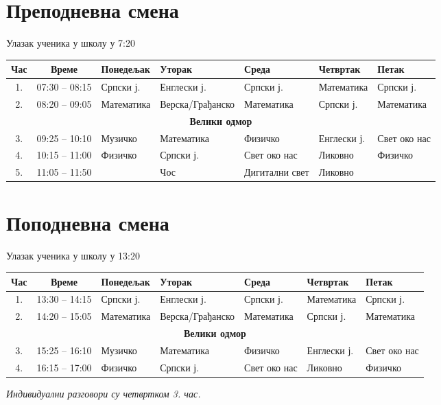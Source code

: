 \documentclass[14pt]{extarticle}
\begin{document}
\section*{Преподневна смена}
\noindent Улазак ученика у школу у 7:20


\bigskip
\noindent
\begin{tabularx}{\textwidth}{|c|c|X|X|X|X|X|}
\hline
\textbf{Час} & \textbf{Време} & \textbf{Понедељак} & \textbf{Уторак} & \textbf{Среда} & \textbf{Четвртак} & \textbf{Петак} \\
\hline
1. & 07:30 -- 08:15 & Српски ј. & Енглески ј. & Српски ј. & Математика & Српски ј. \\
\hline
2. & 08:20 -- 09:05 & Математика & Верска/Грађанско & Математика & Српски ј. & Математика \\
\hline
\multicolumn{7}{|c|}{\textbf{Велики одмор}} \\
\hline
3. & 09:25 -- 10:10 & Музичко & Математика & Физичко & Енглески ј. & Свет око нас \\
\hline
4. & 10:15 -- 11:00 & Физичко & Српски ј. & Свет око нас & Ликовно & Физичко \\
\hline
5. & 11:05 -- 11:50 & & Чос & Дигитални свет & Ликовно &   \\
\hline
\end{tabularx}

\bigskip
\section*{Поподневна смена}
\noindent Улазак ученика у школу у 13:20

\bigskip
\noindent
\begin{tabularx}{\textwidth}{|c|c|X|X|X|X|X|}
\hline
\textbf{Час} & \textbf{Време} & \textbf{Понедељак} & \textbf{Уторак} & \textbf{Среда} & \textbf{Четвртак} & \textbf{Петак} \\
\hline
1. & 13:30 -- 14:15 & Српски ј. & Енглески ј. & Српски ј. & Математика & Српски ј. \\
\hline
2. & 14:20 -- 15:05 & Математика & Верска/Грађанско & Математика & Српски ј. & Математика \\
\hline
\multicolumn{7}{|c|}{\textbf{Велики одмор}} \\
\hline
3. & 15:25 -- 16:10 & Музичко & Математика & Физичко & Енглески ј. & Свет око нас \\
\hline
4. & 16:15 -- 17:00 & Физичко & Српски ј. & Свет око нас & Ликовно & Физичко \\
\hline
\end{tabularx}

\bigskip
\noindent \textit{Индивидуални разговори су четвртком 3. час.}
\end{document}
